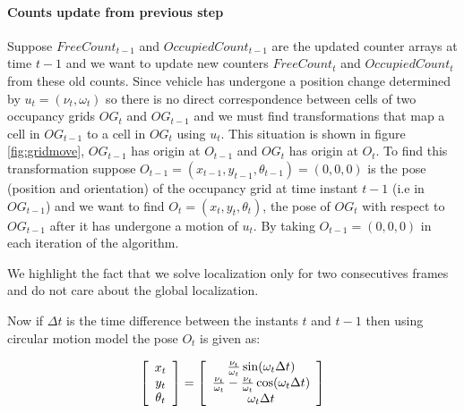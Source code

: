 \paragraph{Counts update from previous step} Suppose $FreeCount_{t-1}$ and  $OccupiedCount_{t-1}$ are the
updated counter arrays at time $t-1$ and we want to update new counters $FreeCount_t$ and $OccupiedCount_t$
from these old counts. Since vehicle has undergone a position change determined by $u_t=(\nu_t, \omega_t)$
so there is no direct correspondence between cells of two occupancy grids $OG_t$ and $OG_{t-1}$ and we
must find transformations that map a cell in  $OG_{t-1}$ to a cell in $OG_{t}$ using $u_t$. This situation is
shown in figure \ref{fig:gridmove}, $OG_{t-1}$ has origin at $O_{t-1}$ and $OG_t$ has origin at $O_t$. To find this transformation suppose $O_{t-1}=(x_{t-1}, y_{t-1}, \theta_{t-1}) = (0,0,0)$ is the pose (position and orientation) of the occupancy grid at time instant $t-1$ (i.e in $OG_{t-1}$) and we want to find $O_t=(x_t, y_t, \theta_t)$, the pose of $OG_t$ with respect to $OG_{t-1}$ after it has undergone a motion of $u_t$. By taking $O_{t-1}=(0,0,0)$ in each iteration of the algorithm.

We highlight the fact that we solve localization only for two consecutives frames and do not care about the global localization. 

Now if $\Delta t$ is the time difference between the instants $t$ and $t-1$ then using circular motion model the pose $O_t$ is given as:

\begin{equation}
\left[\begin{array}{c}x_t \\ y_t\\ \theta_t \end{array} \right] = 
\left[\begin{array}{c} {\nu_t \over \omega_t} \sin(\omega_t \Delta t) \\ {\nu_t \over \omega_t} - {\nu_t \over \omega_t} \cos(\omega_t \Delta t) \\ \omega_t \Delta t \end{array}\right]
\end{equation}

